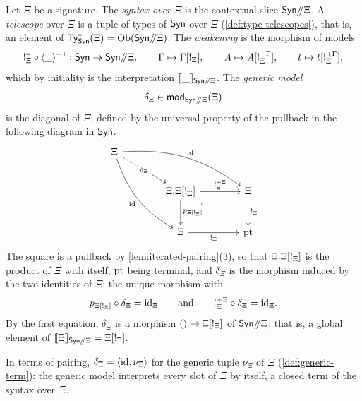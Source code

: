 \begin{definition}\label{def:syntax-over}
    Let $\Xi$ be a signature. The \emph{syntax over} $\Xi$ is the contextual slice $\mathsf{Syn}\mathord{/\mkern-5mu/} \Xi$. A \emph{telescope} over $\Xi$ is a tuple of types of $\mathsf{Syn}$ over $\Xi$ (\cref{def:type-telescopes}), that is, an element of $\mathsf{Ty}^*_{\mathsf{Syn}}(\Xi) = \operatorname{Ob}(\mathsf{Syn}\mathord{/\mkern-5mu/} \Xi)$. The \emph{weakening} is the morphism of models
    \[
        {!}_\Xi^* \circ \langle \_ \rangle^{-1} : \mathsf{Syn} \to \mathsf{Syn}\mathord{/\mkern-5mu/} \Xi, \qquad \Gamma \mapsto \Gamma[{!}_\Xi], \qquad A \mapsto A[{!}_\Xi^{+\Gamma}], \qquad t \mapsto t[{!}_\Xi^{+\Gamma}],
    \]
    which by initiality is the interpretation $\llbracket\_\rrbracket_{\mathsf{Syn}\mathord{/\mkern-5mu/} \Xi}$. The \emph{generic model}
    $$\delta_\Xi \in \mathsf{mod}_{\mathsf{Syn}\mathord{/\mkern-5mu/} \Xi}(\Xi)$$
    is the diagonal of $\Xi$, defined by the universal property of the pullback in the following diagram in $\mathsf{Syn}$.
    \[\begin{tikzcd}[column sep=4em, row sep=2.5em]
        \Xi \\
        & {\Xi.\Xi[\bang_\Xi]} & \Xi \\
        & \Xi & \pt
        \arrow["{\delta_\Xi}"{description}, dashed, from=1-1, to=2-2]
        \arrow["\id", bend left=20, from=1-1, to=2-3]
        \arrow["\id"', bend right=20, from=1-1, to=3-2]
        \arrow["{\bang_\Xi^{+\Xi}}", from=2-2, to=2-3]
        \arrow["{p_{\Xi[\bang_\Xi]}}", from=2-2, to=3-2]
        \arrow["\lrcorner"{anchor=center, pos=0.125}, draw=none, from=2-2, to=3-3]
        \arrow["{\bang_\Xi}", from=2-3, to=3-3]
        \arrow["{\bang_\Xi}"', from=3-2, to=3-3]
    \end{tikzcd}\]
    The square is a pullback by \cref{lem:iterated-pairing}(3), so that $\Xi.\Xi[{!}_\Xi]$ is the product of $\Xi$ with itself, $\mathrm{pt}$ being terminal, and $\delta_\Xi$ is the morphism induced by the two identities of $\Xi$: the unique morphism with
    \[
        p_{\Xi[{!}_\Xi]} \circ \delta_\Xi = \mathrm{id}_\Xi \qquad \text{and} \qquad {!}_\Xi^{+\Xi} \circ \delta_\Xi = \mathrm{id}_\Xi.
    \]
    By the first equation, $\delta_\Xi$ is a morphism $() \to \Xi[{!}_\Xi]$ of $\mathsf{Syn}\mathord{/\mkern-5mu/} \Xi$, that is, a global element of $\llbracket\Xi\rrbracket_{\mathsf{Syn}\mathord{/\mkern-5mu/} \Xi} = \Xi[{!}_\Xi]$.
\end{definition}

In terms of pairing, $\delta_\Xi = \langle \mathrm{id}, \nu_\Xi \rangle$ for the generic tuple $\nu_\Xi$ of $\Xi$ (\cref{def:generic-term}): the generic model interprets every slot of $\Xi$ by itself, a closed term of the syntax over $\Xi$.

